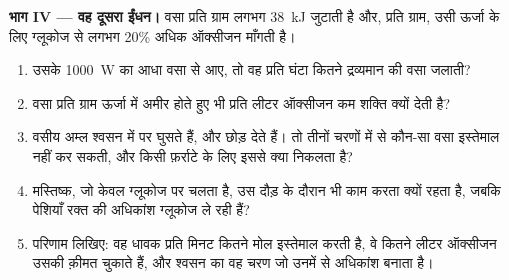\begin{problem}
\medskip
\noindent\textbf{भाग IV --- वह दूसरा ईंधन।}
वसा प्रति ग्राम लगभग \qty{38}{kJ} जुटाती है और, प्रति ग्राम, उसी ऊर्जा के
लिए ग्लूकोज से लगभग 20\% अधिक ऑक्सीजन माँगती है।
\begin{enumerate}[resume]
  \item उसके \qty{1000}{W} का आधा वसा से आए, तो वह प्रति घंटा कितने
        द्रव्यमान की वसा जलाती?
  \item वसा प्रति ग्राम ऊर्जा में अमीर होते हुए भी प्रति लीटर ऑक्सीजन कम
        शक्ति क्यों देती है?
  \item वसीय अम्ल श्वसन में  पर घुसते हैं, और 
        छोड़ देते हैं। तो तीनों चरणों में से कौन-सा वसा इस्तेमाल नहीं कर
        सकती, और किसी फ़र्राटे के लिए इससे क्या निकलता है?
  \item मस्तिष्क, जो केवल ग्लूकोज पर चलता है, उस दौड़ के दौरान भी काम करता
        क्यों रहता है, जबकि पेशियाँ रक्त की अधिकांश ग्लूकोज ले रही हैं?
  \item परिणाम लिखिए: वह धावक प्रति मिनट कितने मोल  इस्तेमाल करती है, वे
        कितने लीटर ऑक्सीजन उसकी क़ीमत चुकाते हैं, और श्वसन का वह चरण जो
        उनमें से अधिकांश बनाता है।
\end{enumerate}
\end{problem}
